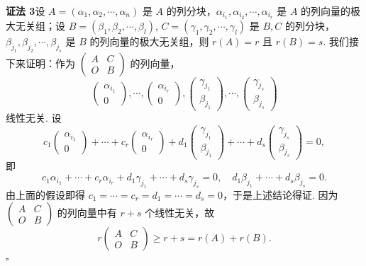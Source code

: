 \documentclass[UTF8,12pt,a4paper,fontset=fandol]{ctexart}
\begin{document}
\noindent\textbf{证法 3}\quad 设 $A=(\alpha_1,\alpha_2,\cdots,\alpha_n)$ 是 $A$ 的列分块，$\alpha_{i_1},\alpha_{i_2},\cdots,\alpha_{i_r}$ 是 $A$ 的列向量的极大无关组；设 $B=(\beta_1,\beta_2,\cdots,\beta_l)$, $C=(\gamma_1,\gamma_2,\cdots,\gamma_l)$ 是 $B,C$ 的列分块，$\beta_{j_1},\beta_{j_2},\cdots,\beta_{j_s}$ 是 $B$ 的列向量的极大无关组，则 $r(A)=r$ 且 $r(B)=s$. 我们接下来证明：作为 $\begin{pmatrix}A&C\\O&B\end{pmatrix}$ 的列向量，
\[
\begin{pmatrix}\alpha_{i_1}\\0\end{pmatrix},\cdots,\begin{pmatrix}\alpha_{i_r}\\0\end{pmatrix},
\begin{pmatrix}\gamma_{j_1}\\\beta_{j_1}\end{pmatrix},\cdots,
\begin{pmatrix}\gamma_{j_s}\\\beta_{j_s}\end{pmatrix}
\]
线性无关. 设
\[
c_1\begin{pmatrix}\alpha_{i_1}\\0\end{pmatrix}+\cdots+c_r\begin{pmatrix}\alpha_{i_r}\\0\end{pmatrix}
+d_1\begin{pmatrix}\gamma_{j_1}\\\beta_{j_1}\end{pmatrix}+\cdots+d_s\begin{pmatrix}\gamma_{j_s}\\\beta_{j_s}\end{pmatrix}=0,
\]
即
\[
c_1\alpha_{i_1}+\cdots+c_r\alpha_{i_r}+d_1\gamma_{j_1}+\cdots+d_s\gamma_{j_s}=0,\quad
d_1\beta_{j_1}+\cdots+d_s\beta_{j_s}=0.
\]
由上面的假设即得 $c_1=\cdots=c_r=d_1=\cdots=d_s=0$，于是上述结论得证. 因为 $\begin{pmatrix}A&C\\O&B\end{pmatrix}$ 的列向量中有 $r+s$ 个线性无关，故
\[
r\begin{pmatrix}A&C\\O&B\end{pmatrix}\ge r+s=r(A)+r(B).
\]
$\square$
\end{document}
